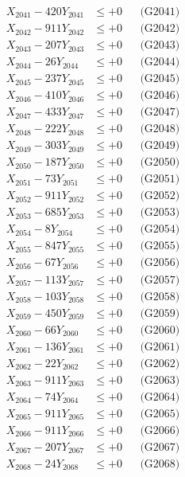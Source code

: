\documentclass[a4paper,10pt]{article}
\begin{document}
{\begin{align}
\allowbreak
X_{2041} - 420Y_{2041} &\leq +0 && \text{(G2041)} \\
X_{2042} - 911Y_{2042} &\leq +0 && \text{(G2042)} \\
X_{2043} - 207Y_{2043} &\leq +0 && \text{(G2043)} \\
X_{2044} - 26Y_{2044} &\leq +0 && \text{(G2044)} \\
X_{2045} - 237Y_{2045} &\leq +0 && \text{(G2045)} \\
X_{2046} - 410Y_{2046} &\leq +0 && \text{(G2046)} \\
X_{2047} - 433Y_{2047} &\leq +0 && \text{(G2047)} \\
X_{2048} - 222Y_{2048} &\leq +0 && \text{(G2048)} \\
X_{2049} - 303Y_{2049} &\leq +0 && \text{(G2049)} \\
X_{2050} - 187Y_{2050} &\leq +0 && \text{(G2050)} \\
\allowbreak
X_{2051} - 73Y_{2051} &\leq +0 && \text{(G2051)} \\
X_{2052} - 911Y_{2052} &\leq +0 && \text{(G2052)} \\
X_{2053} - 685Y_{2053} &\leq +0 && \text{(G2053)} \\
X_{2054} - 8Y_{2054} &\leq +0 && \text{(G2054)} \\
X_{2055} - 847Y_{2055} &\leq +0 && \text{(G2055)} \\
X_{2056} - 67Y_{2056} &\leq +0 && \text{(G2056)} \\
X_{2057} - 113Y_{2057} &\leq +0 && \text{(G2057)} \\
X_{2058} - 103Y_{2058} &\leq +0 && \text{(G2058)} \\
X_{2059} - 450Y_{2059} &\leq +0 && \text{(G2059)} \\
X_{2060} - 66Y_{2060} &\leq +0 && \text{(G2060)} \\
\allowbreak
X_{2061} - 136Y_{2061} &\leq +0 && \text{(G2061)} \\
X_{2062} - 22Y_{2062} &\leq +0 && \text{(G2062)} \\
X_{2063} - 911Y_{2063} &\leq +0 && \text{(G2063)} \\
X_{2064} - 74Y_{2064} &\leq +0 && \text{(G2064)} \\
X_{2065} - 911Y_{2065} &\leq +0 && \text{(G2065)} \\
X_{2066} - 911Y_{2066} &\leq +0 && \text{(G2066)} \\
X_{2067} - 207Y_{2067} &\leq +0 && \text{(G2067)} \\
X_{2068} - 24Y_{2068} &\leq +0 && \text{(G2068)} \\

\end{align}}
\end{document}
